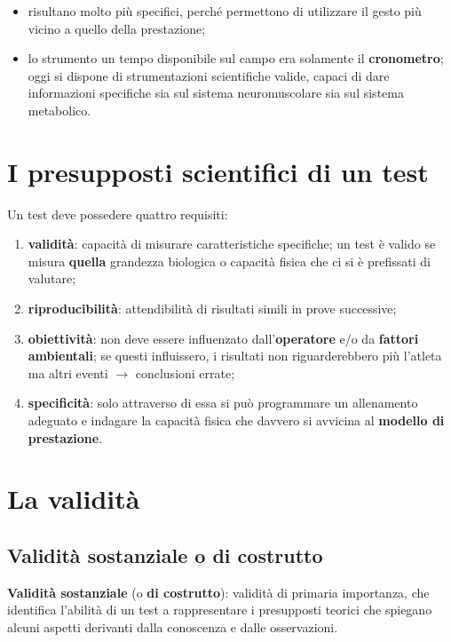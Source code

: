 \begin{itemize}
  \item risultano molto più specifici, perché permettono di utilizzare il gesto più vicino a
    quello della prestazione;
  \item lo strumento un tempo disponibile sul campo era solamente il \textbf{cronometro}; oggi si
    dispone di strumentazioni scientifiche valide, capaci di dare informazioni specifiche sia sul
    sistema neuromuscolare sia sul sistema metabolico.
\end{itemize}

\section{I presupposti scientifici di un test}

Un test deve possedere quattro requisiti:
\begin{enumerate}
  \item \textbf{validità}: capacità di misurare caratteristiche specifiche; un test è valido se
    misura \textbf{quella} grandezza biologica o capacità fisica che ci si è prefissati di
    valutare;
  \item \textbf{riproducibilità}: attendibilità di risultati simili in prove successive;
  \item \textbf{obiettività}: non deve essere influenzato dall'\textbf{operatore} e/o da
    \textbf{fattori ambientali}; se questi influissero, i risultati non riguarderebbero più
    l'atleta ma altri eventi $\rightarrow$ conclusioni errate;
  \item \textbf{specificità}: solo attraverso di essa si può programmare un allenamento adeguato e
    indagare la capacità fisica che davvero si avvicina al \textbf{modello di prestazione}.
\end{enumerate}

\section{La validità}

\subsection{Validità sostanziale o di costrutto}

\textbf{Validità sostanziale} (o \textbf{di costrutto}): validità di primaria importanza, che
identifica l'abilità di un test a rappresentare i presupposti teorici che spiegano alcuni aspetti
derivanti dalla conoscenza e dalle osservazioni.

